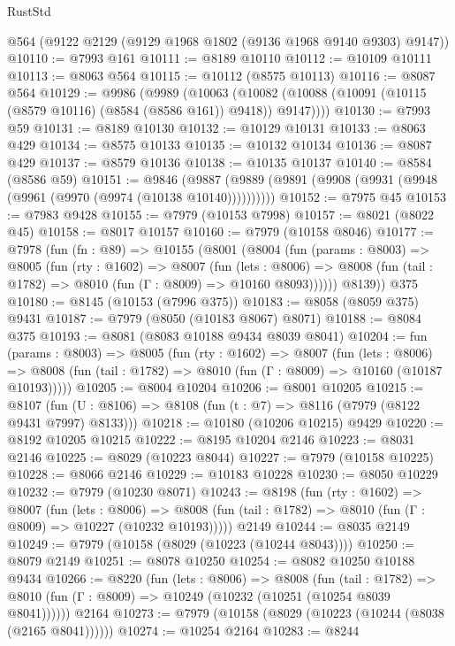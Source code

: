 \begin{lexlean}{RustStd}
\begin{coremodule}
    @564
    (@9122 @2129 (@9129 @1968 @1802 (@9136 @1968 @9140 @9303) @9147))
@10110 := @7993 @161
@10111 := @8189 @10110
@10112 := @10109 @10111
@10113 := @8063 @564
@10115 := @10112 (@8575 @10113)
@10116 := @8087 @564
@10129 := @9986
    (@9989
      (@10063 (@10082 (@10088 (@10091 (@10115 (@8579 @10116) (@8584 (@8586 @161)) @9418)) @9147))))
@10130 := @7993 @59
@10131 := @8189 @10130
@10132 := @10129 @10131
@10133 := @8063 @429
@10134 := @8575 @10133
@10135 := @10132 @10134
@10136 := @8087 @429
@10137 := @8579 @10136
@10138 := @10135 @10137
@10140 := @8584 (@8586 @59)
@10151 := @9846
    (@9887 (@9889 (@9891 (@9908 (@9931 (@9948 (@9961 (@9970 (@9974 (@10138 @10140))))))))))
@10152 := @7975 @45
@10153 := @7983 @9428
@10155 := @7979 (@10153 @7998)
@10157 := @8021 (@8022 @45)
@10158 := @8017 @10157
@10160 := @7979 (@10158 @8046)
@10177 := @7978
    (fun (fn : @89) =>
    @10155
      (@8001
        (@8004
          (fun (params : @8003) =>
          @8005
            (fun (rty : @1602) =>
            @8007
              (fun (lets : @8006) =>
              @8008 (fun (tail : @1782) => @8010 (fun (Γ : @8009) => @10160 @8093))))))
        @8139))
    @375
@10180 := @8145 (@10153 (@7996 @375))
@10183 := @8058 (@8059 @375) @9431
@10187 := @7979 (@8050 (@10183 @8067) @8071)
@10188 := @8084 @375
@10193 := @8081 (@8083 @10188 @9434 @8039 @8041)
@10204 := fun (params : @8003) =>
  @8005
    (fun (rty : @1602) =>
    @8007
      (fun (lets : @8006) =>
      @8008 (fun (tail : @1782) => @8010 (fun (Γ : @8009) => @10160 (@10187 @10193)))))
@10205 := @8004 @10204
@10206 := @8001 @10205
@10215 := @8107 (fun (U : @8106) => @8108 (fun (t : @7) => @8116 (@7979 (@8122 @9431 @7997) @8133)))
@10218 := @10180 (@10206 @10215) @9429
@10220 := @8192 @10205 @10215
@10222 := @8195 @10204 @2146
@10223 := @8031 @2146
@10225 := @8029 (@10223 @8044)
@10227 := @7979 (@10158 @10225)
@10228 := @8066 @2146
@10229 := @10183 @10228
@10230 := @8050 @10229
@10232 := @7979 (@10230 @8071)
@10243 := @8198
    (fun (rty : @1602) =>
    @8007
      (fun (lets : @8006) =>
      @8008 (fun (tail : @1782) => @8010 (fun (Γ : @8009) => @10227 (@10232 @10193)))))
    @2149
@10244 := @8035 @2149
@10249 := @7979 (@10158 (@8029 (@10223 (@10244 @8043))))
@10250 := @8079 @2149
@10251 := @8078 @10250
@10254 := @8082 @10250 @10188 @9434
@10266 := @8220
    (fun (lets : @8006) =>
    @8008
      (fun (tail : @1782) =>
      @8010 (fun (Γ : @8009) => @10249 (@10232 (@10251 (@10254 @8039 @8041))))))
    @2164
@10273 := @7979 (@10158 (@8029 (@10223 (@10244 (@8038 (@2165 @8041))))))
@10274 := @10254 @2164
@10283 := @8244

\end{coremodule}
\end{lexlean}

